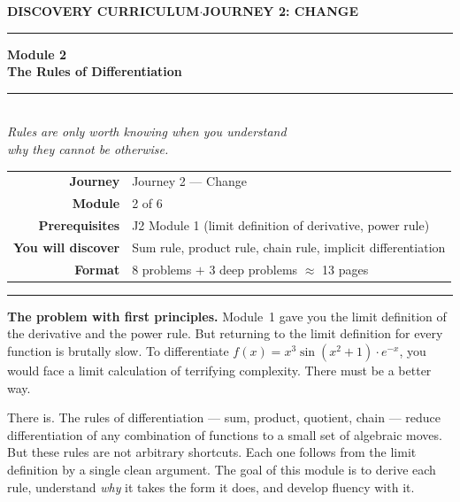 \documentclass[12pt, a4paper]{article}
\newcounter{problem}
\begin{document}

\thispagestyle{empty}
\begin{center}
{\small\color{MidBlue}\textbf{DISCOVERY CURRICULUM}\quad$\cdot$\quad\textbf{JOURNEY 2: CHANGE}}

\vspace{0.6cm}
{\color{NavyBlue}\rule{\linewidth}{2pt}}
\vspace{0.5cm}

{\Huge\bfseries\color{NavyBlue}Module 2}\\[0.3cm]
{\LARGE\bfseries\color{MidBlue}The Rules of Differentiation}\\[0.4cm]
{\color{Gold}\rule{0.4\linewidth}{1.2pt}}\\[0.4cm]
{\large\itshape\color{DarkGrey}
Rules are only worth knowing when you understand\\[0.15cm]
why they cannot be otherwise.}

\vspace{1cm}
\begin{tabular}{rl}
\color{DarkGrey}\textbf{Journey}           & Journey 2 --- Change \\[4pt]
\color{DarkGrey}\textbf{Module}            & 2 of 6 \\[4pt]
\color{DarkGrey}\textbf{Prerequisites}     & J2 Module 1 (limit definition of derivative, power rule) \\[4pt]
\color{DarkGrey}\textbf{You will discover} & Sum rule, product rule, chain rule, implicit differentiation \\[4pt]
\color{DarkGrey}\textbf{Format}            & 8 problems $+$ 3 deep problems $\approx$ 13 pages \\
\end{tabular}

\vspace{1cm}
{\color{NavyBlue}\rule{\linewidth}{2pt}}
\end{center}

\vspace{0.5cm}

\noindent\textbf{The problem with first principles.}
Module~1 gave you the limit definition of the derivative and the power rule. But returning to the limit definition for every function is brutally slow. To differentiate $f(x) = x^3 \sin(x^2 + 1) \cdot e^{-x}$, you would face a limit calculation of terrifying complexity. There must be a better way.

\medskip
There is. The rules of differentiation --- sum, product, quotient, chain --- reduce differentiation of any combination of functions to a small set of algebraic moves. But these rules are not arbitrary shortcuts. Each one follows from the limit definition by a single clean argument. The goal of this module is to derive each rule, understand \emph{why} it takes the form it does, and develop fluency with it.
\end{document}
